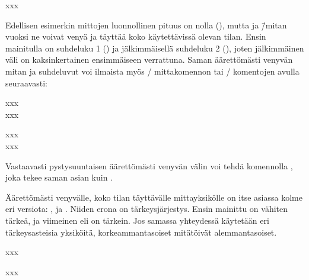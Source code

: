 \begin{tulossis}
  x\hspace{0mm plus 1fill}x\hspace{0mm plus 2fill}x
\end{tulossis}

Edellisen esimerkin mittojen luonnollinen pituus on nolla (\koodi{0mm}),
mutta  ja  \=/mitan vuoksi ne voivat venyä ja
täyttää koko käytettävissä olevan tilan. Ensin mainitulla on suhdeluku 1
() ja jälkimmäisellä suhdeluku 2 (), joten
jälkimmäinen väli on kaksinkertainen ensimmäiseen verrattuna. Saman
äärettömästi venyvän mitan ja suhdeluvut voi ilmaista myös
\-/ mittakomennon tai \-/ komentojen
avulla seuraavasti:

\begin{koodilohkosis}
xxx \\
x\hfill x\hfill\hfill x
\end{koodilohkosis}

\begin{tulossis}
  xxx \\
  x\hfill x\hfill\hfill x
\end{tulossis}

Vastaavasti pystysuuntaisen äärettömästi venyvän välin voi tehdä
komennolla , joka tekee saman asian kuin .

Äärettömästi venyvälle, koko tilan täyttävälle mittayksikölle on itse
asiassa kolme eri versiota: ,  ja .
Niiden erona on tärkeysjärjestys. Ensin mainittu  on vähiten
tärkeä, ja viimeinen eli  on tärkein. Jos samassa
yhteydessä käytetään eri tärkeysasteisia yksiköitä, korkeammantasoiset
mitätöivät alemmantasoiset.

\begin{koodilohkosis}
x\hspace{0mm plus 1filll}x\hspace{0mm plus 1fill}x
\end{koodilohkosis}

\begin{tulossis}
  x\hspace{0mm plus 1filll}x\hspace{0mm plus 1fill}x
\end{tulossis}

